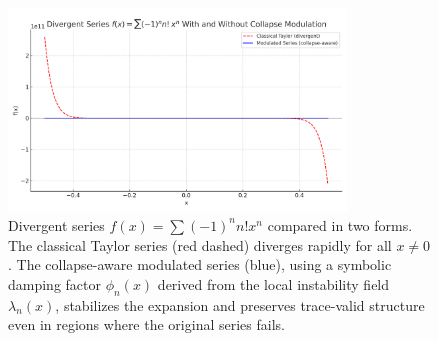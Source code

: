 
\begin{figure}[htbp]
    \centering
    \includegraphics[width=0.8\textwidth]{Modulated_Taylor_Collapse.png}
    \caption{
        Divergent series $f(x) = \sum (-1)^n n! x^n$ compared in two forms.
        The classical Taylor series (red dashed) diverges rapidly for all $x \neq 0$.
        The collapse-aware modulated series (blue), using a symbolic damping factor $\phi_n(x)$ derived from the local instability field $\lambda_n(x)$, stabilizes the expansion and preserves trace-valid structure even in regions where the original series fails.
    }
    \label{fig:collapse_modulated_taylor}
\end{figure}
